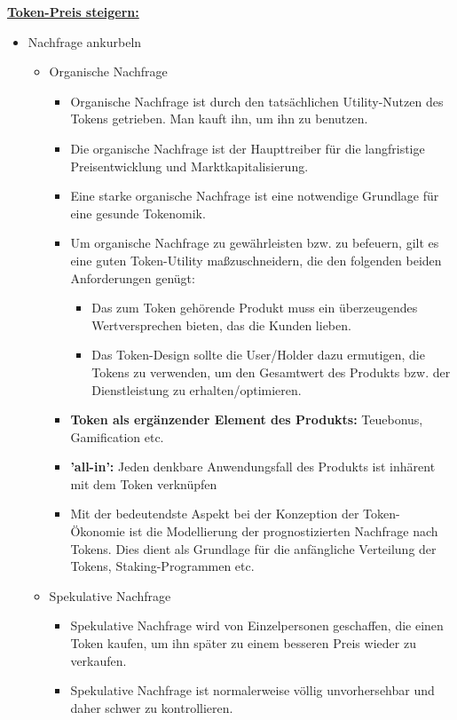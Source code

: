 \begin{Zitat*}
\vspace{0.3cm}


\underline{\textbf{Token-Preis steigern:}}

\begin{itemize}
  \item Nachfrage ankurbeln
  \begin{itemize}
  	\item Organische Nachfrage
	\begin{itemize}
		\item Organische Nachfrage ist durch den tatsächlichen Utility-Nutzen des Tokens getrieben. Man kauft ihn, um ihn zu benutzen.
		\item Die organische Nachfrage ist der Haupttreiber für die langfristige Preisentwicklung und Marktkapitalisierung.
		\item Eine starke organische Nachfrage ist eine notwendige Grundlage für eine gesunde Tokenomik.
		\item Um organische Nachfrage zu gewährleisten bzw. zu befeuern, gilt es eine guten Token-Utility maßzuschneidern, die den folgenden beiden Anforderungen genügt:
		\begin{itemize}
			\item Das zum Token gehörende Produkt muss ein überzeugendes Wertversprechen bieten, das die Kunden lieben.
			\item Das Token-Design sollte die User/Holder dazu ermutigen, die Tokens zu verwenden, um den Gesamtwert des Produkts bzw. der Dienstleistung zu erhalten/optimieren.
		\end{itemize}
		\item \textbf{Token als ergänzender Element des Produkts:} Teuebonus, Gamification etc.
		\item \textbf{'all-in':} Jeden denkbare Anwendungsfall des Produkts ist inhärent mit dem Token verknüpfen
		\item Mit der bedeutendste Aspekt bei der Konzeption der Token-Ökonomie ist die Modellierung der prognostizierten Nachfrage nach Tokens. Dies dient als Grundlage für die anfängliche Verteilung der Tokens, Staking-Programmen etc.
	\end{itemize}
  	\item Spekulative Nachfrage
	\begin{itemize}
		\item Spekulative Nachfrage wird von Einzelpersonen geschaffen, die einen Token kaufen, um ihn später zu einem besseren Preis wieder zu verkaufen.
		\item Spekulative Nachfrage ist normalerweise völlig unvorhersehbar und daher schwer zu kontrollieren.

\end{itemize}
\end{itemize}
\end{itemize}
\end{Zitat*}
